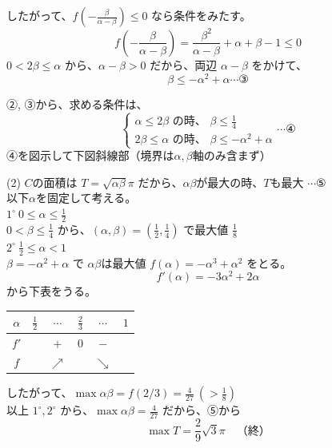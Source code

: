 \documentclass[../main.tex]{subfiles}
\begin{document}
したがって、$f\left(-\frac{\beta}{\alpha-\beta}\right) \le 0$ なら条件をみたす。
\[ f\left(-\frac{\beta}{\alpha-\beta}\right) = \frac{\beta^2}{\alpha-\beta} + \alpha + \beta - 1 \le 0 \]
$0 < 2\beta \le \alpha$ から、$\alpha - \beta > 0$ だから、両辺 $\alpha - \beta$ をかけて、
\[ \beta \le -\alpha^2 + \alpha \cdots \text{③} \]

②, ③から、求める条件は、
\[
  \begin{cases} \alpha \le 2\beta \text{ の時、 } \beta \le \frac{1}{4} \\ 2\beta \le \alpha \text{ の時、 } \beta \le -\alpha^2 + \alpha
\end{cases} \cdots \text{④} \]
④を図示して下図斜線部（境界は$\alpha, \beta$軸のみ含まず）

\begin{center}
\end{center}

(2) $C$の面積は $T = \sqrt{\alpha\beta} \pi$ だから、$\alpha\beta$が最大の時、$T$も最大 $\cdots \text{⑤}$ \\
以下$\alpha$を固定して考える。\\
$1^\circ \ 0 \le \alpha \le \frac{1}{2}$ \\
$0 < \beta \le \frac{1}{4}$ から、$(\alpha, \beta) = (\frac{1}{2}, \frac{1}{4})$ で最大値 $\frac{1}{8}$ \\
$2^\circ \ \frac{1}{2} \le \alpha < 1$ \\
$\beta = -\alpha^2 + \alpha$ で $\alpha\beta$は最大値 $f(\alpha) = -\alpha^3 + \alpha^2$ をとる。
\[ f'(\alpha) = -3\alpha^2 + 2\alpha \]
から下表をうる。
\begin{center}
  \begin{tabular}{|c|c|c|c|c|c|}
    \hline
    $\alpha$ & $\frac{1}{2}$ & $\cdots$ & $\frac{2}{3}$ & $\cdots$ & $1$ \\
    \hline
    $f'$ & & $+$ & $0$ & $-$ & \\
    \hline
    $f$ & & $\nearrow$ & & $\searrow$ & \\
    \hline
  \end{tabular}
\end{center}
したがって、$\max \alpha\beta = f(2/3) = \frac{4}{27} \ (> \frac{1}{8})$ \\
以上 $1^\circ, 2^\circ$ から、$\max \alpha\beta = \frac{4}{27}$ だから、⑤から
\[ \max T = \frac{2}{9} \sqrt{3} \pi \quad \text{（終）} \]
\end{document}
